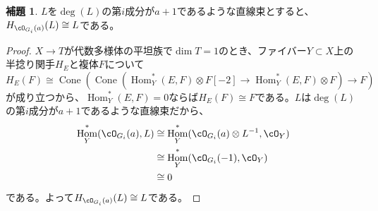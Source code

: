 \documentclass[uplatex, a4paper, dvipdfmx]{jsarticle}
\theoremstyle{definition}
\newtheorem{lemma}[theorem]{補題}
\DeclareMathOperator{\Hom}{\mathrm{Hom}}
\DeclareMathOperator{\Cone}{\mathrm{Cone}}
\begin{document}
\begin{lemma}\label{lem:preserved-line-bundle}
    $L$を$\deg(L)$の第$i$成分が$a+1$であるような直線束とすると、$H_{\cO_{G_i}(a)}(L) \cong L$である。
\end{lemma}
\begin{proof}
    $X \to T$が代数多様体の平坦族で$\dim T= 1$のとき、ファイバー$Y \subset X$上の半捻り関手$H_E$と複体$F$について
    \begin{equation}
        H_E(F) \cong \Cone\left(\Cone(\Hom^*_Y(E, F) \otimes F[-2] \to \Hom^*_Y(E, F) \otimes F) \to F\right)
    \end{equation}
    が成り立つから、$\Hom^*_Y(E, F) = 0$ならば$H_E(F) \cong F$である。$L$は$\deg(L)$の第$i$成分が$a+1$であるような直線束だから、
    \begin{align}
        \Hom^*_Y(\cO_{G_i}(a), L) & \cong \Hom^*_Y(\cO_{G_i}(a)\otimes L^{-1}, \cO_Y) \\
                                  & \cong \Hom_Y^*(\cO_{G_i}(-1), \cO_Y)              \\
                                  & \cong 0
    \end{align}
    である。よって$H_{\cO_{G_i}(a)}(L) \cong L$である。
\end{proof}
\end{document}
